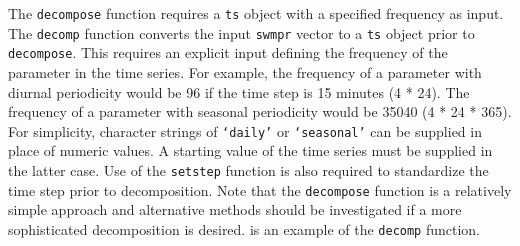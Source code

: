 \documentclass[10pt,letterpaper]{article}\usepackage[]{graphicx}\usepackage[]{color}
\begin{document}
The \texttt{decompose} function requires a \texttt{ts} object with a specified frequency as input.  The \texttt{decomp} function converts the input \texttt{swmpr} vector to a \texttt{ts} object prior to \texttt{decompose}.  This requires an explicit input defining the frequency of the parameter in the time series.  For example, the frequency of a parameter with diurnal periodicity would be 96 if the time step is 15 minutes (4 * 24).  The frequency of a parameter with seasonal periodicity would be 35040 (4 * 24 * 365).  For simplicity, character strings of \texttt{`daily'} or \texttt{`seasonal'} can be supplied in place of numeric values.  A starting value of the time series must be supplied in the latter case.  Use of the \texttt{setstep} function is also required to standardize the time step prior to decomposition.  Note that the \texttt{decompose} function is a relatively simple approach and alternative methods should be investigated if a more sophisticated decomposition is desired.   is an example of the \texttt{decomp} function.
\end{document}
